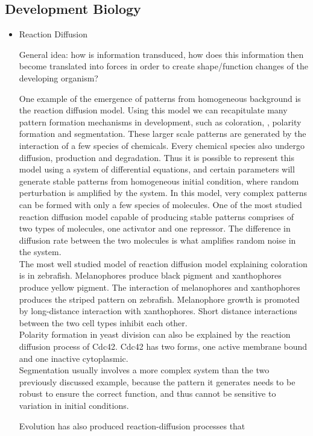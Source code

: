 \documentclass{article}
\begin{document}
\subsection{Development Biology}
\begin{itemize}
\item{Reaction Diffusion} 

General idea: how is information transduced, how does this information then become translated into forces in order to create shape/function changes of the developing organism?

One example of the emergence of patterns from homogeneous background is the reaction diffusion model. Using this model we can recapitulate many pattern formation mechanisms in development, such as coloration, , polarity formation and segmentation. These larger scale patterns are generated by the interaction of a few species of chemicals. Every chemical species also  undergo diffusion, production and degradation. Thus it is possible to represent this model using a system of differential equations, and certain parameters will generate stable patterns from homogeneous initial condition, where random perturbation is amplified by the system. In this model, very complex patterns can be formed with only a few species of molecules\cite{kondo2010reaction}. One of the most studied reaction diffusion model capable of producing stable patterns comprises of two types of molecules, one activator and one repressor. The difference in diffusion rate between the two molecules is what amplifies random noise in the system.\cite{gierer1972theory}\\ 

The most well studied model of reaction diffusion model explaining coloration is in zebrafish. Melanophores produce black pigment and xanthophores produce yellow pigment.\cite{nakamasu2009interactions} The interaction of melanophores and xanthophores produces the striped pattern on zebrafish. Melanophore growth is promoted by long-distance interaction with xanthophores. Short distance interactions between the two cell types inhibit each other. \\

Polarity formation in yeast division can also be explained by the reaction diffusion process of Cdc42. Cdc42 has two forms, one active membrane bound and one inactive cytoplasmic.  \cite{goryachev2008dynamics} \\

Segmentation usually involves a more complex system than the two previously discussed example, because the pattern it generates needs to be robust to ensure the correct function, and thus cannot be sensitive to variation in initial conditions. 

Evolution has also produced reaction-diffusion processes that 
\end{itemize}
\end{document}
